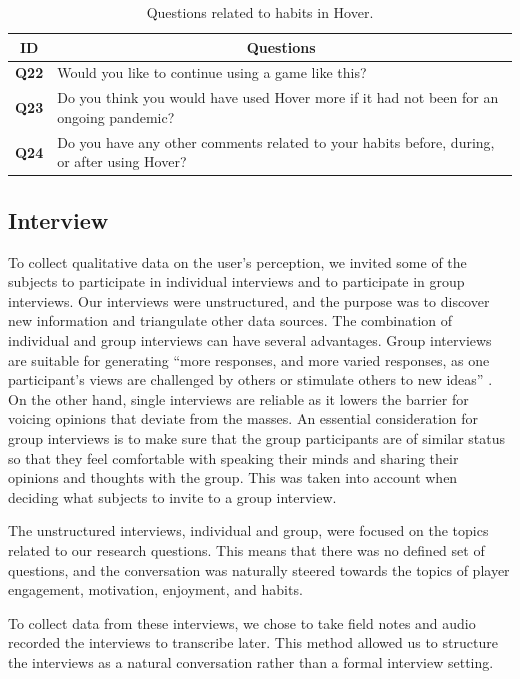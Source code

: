 \begin{table}[H]
    \centering
    \begin{tabularx}{0.95\textwidth}{|c|X|}
        \hline
        \textbf{ID} & \multicolumn{1}{c|}{\textbf{Questions}} \\ \hline
        \textbf{Q22} & Would you like to continue using a game like this?  \\
        \textbf{Q23} & Do you think you would have used Hover more if it had not been for an ongoing pandemic? \\
        \textbf{Q24} & Do you have any other comments related to your habits before, during, or after using Hover? \\ \hline
    \end{tabularx}
    \caption{Questions related to habits in Hover.}
    \label{tab:player_habits_questions}
\end{table}

\subsection{Interview}
To collect qualitative data on the user’s perception, we invited some of the subjects to participate in individual interviews and to participate in group interviews. Our interviews were unstructured, and the purpose was to discover new information and triangulate other data sources. The combination of individual and group interviews can have several advantages. Group interviews are suitable for generating “more responses, and more varied responses, as one participant’s views are challenged by others or stimulate others to new ideas” \citep{oates_researching_2006}. On the other hand, single interviews are reliable as it lowers the barrier for voicing opinions that deviate from the masses. An essential consideration for group interviews is to make sure that the group participants are of similar status so that they feel comfortable with speaking their minds and sharing their opinions and thoughts with the group. This was taken into account when deciding what subjects to invite to a group interview.

The unstructured interviews, individual and group, were focused on the topics related to our research questions. This means that there was no defined set of questions, and the conversation was naturally steered towards the topics of player engagement, motivation, enjoyment, and habits.

To collect data from these interviews, we chose to take field notes and audio recorded the interviews to transcribe later. This method allowed us to structure the interviews as a natural conversation rather than a formal interview setting.

